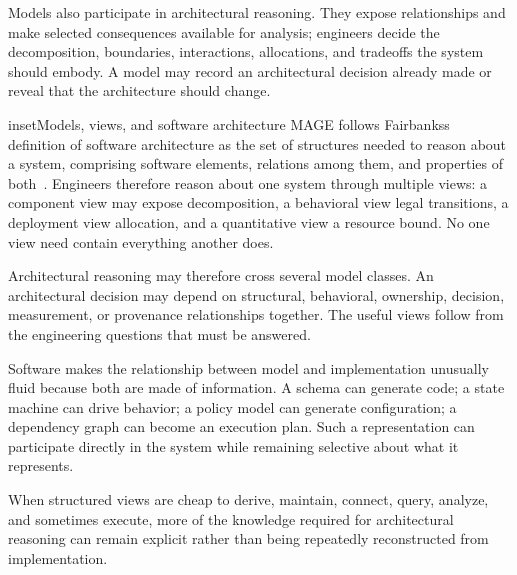 Models also participate in architectural reasoning. They expose relationships and make selected consequences available for analysis; engineers decide the decomposition, boundaries, interactions, allocations, and tradeoffs the system should embody. A model may record an architectural decision already made or reveal that the architecture should change.




\begin{bookbox}{inset}{Models, views, and software architecture}
\label{inset-models-views}
MAGE follows Fairbanks\textquotesingle s definition of software architecture as the set of structures needed to reason about a system, comprising software elements, relations among them, and properties of both~\citep{fairbanks2010}. Engineers therefore reason about one system through multiple views: a component view may expose decomposition, a behavioral view legal transitions, a deployment view allocation, and a quantitative view a resource bound. No one view need contain everything another does.

Architectural reasoning may therefore cross several model classes. An architectural decision may depend on structural, behavioral, ownership, decision, measurement, or provenance relationships together. The useful views follow from the engineering questions that must be answered.

Software makes the relationship between model and implementation unusually fluid because both are made of information. A schema can generate code; a state machine can drive behavior; a policy model can generate configuration; a dependency graph can become an execution plan. Such a representation can participate directly in the system while remaining selective about what it represents.

When structured views are cheap to derive, maintain, connect, query, analyze, and sometimes execute, more of the knowledge required for architectural reasoning can remain explicit rather than being repeatedly reconstructed from implementation.
\end{bookbox}


